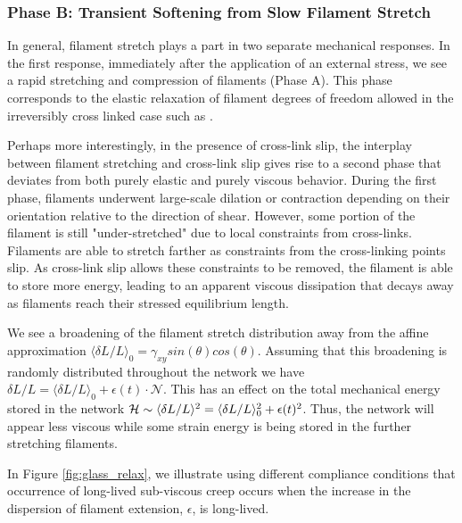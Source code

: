 \documentclass[pre,reprint]{revtex4-1}
\begin{document}
\subsubsection{Phase B: Transient Softening from Slow Filament Stretch}
\label{sec:compliant}
In general, filament stretch plays a part in two separate mechanical responses.  In the first response, immediately after the application of an external stress, we see a rapid stretching and compression of filaments (Phase A). This phase corresponds to the elastic relaxation of filament degrees of freedom allowed in the irreversibly cross linked case such as \cite{theo_hlm,theo_hlm2}.  

Perhaps more interestingly, in the presence of cross-link slip, the interplay between filament stretching and cross-link slip gives rise to a second phase that deviates from both purely elastic and purely viscous behavior.  During the first phase, filaments underwent large-scale dilation or contraction depending on their orientation relative to the direction of shear.  However, some portion of the filament is still "under-stretched" due to local constraints from cross-links.  Filaments are able to stretch farther as constraints from the cross-linking points slip.  As cross-link slip allows these constraints to be removed, the filament is able to store more energy, leading to an apparent viscous dissipation that decays away as filaments reach their stressed equilibrium length. 

We see a broadening of the filament stretch distribution away from the affine approximation $\langle \delta L/L\rangle_0 = \gamma_{xy}sin(\theta)cos(\theta)$.  Assuming that this broadening is randomly distributed throughout the network we have $\delta L/L = \langle \delta L/L\rangle_0 + \epsilon(t)\cdot\mathcal{N}$.  This has an effect on the total mechanical energy stored in the network ${\cal H} \sim  \langle\delta L/L\rangle^2 = \langle\delta L/L\rangle_0^2 +\epsilon(t)^2 $.  Thus, the network will appear less viscous while some strain energy is being stored in the further stretching filaments.  

In Figure \ref{fig:glass_relax}, we illustrate using different compliance conditions that occurrence of long-lived sub-viscous creep occurs when the increase in the dispersion of filament extension, $\epsilon$, is long-lived.
\end{document}
